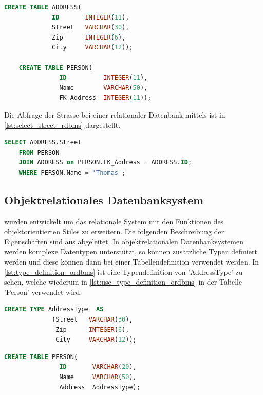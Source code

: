 \begin{lstlisting}[language=SQL, caption=Tabellendefinition in relationalem Datenbanksystem, label=lst:table_definition_rdbms]  
    CREATE TABLE ADDRESS(
             ID       INTEGER(11),
             Street   VARCHAR(30),
             Zip      INTEGER(6),
             City     VARCHAR(12));

    CREATE TABLE PERSON(
               ID          INTEGER(11),
               Name        VARCHAR(50),
               FK_Address  INTEGER(11));
\end{lstlisting}

Die Abfrage der Strasse bei einer relationaler Datenbank mittels  ist in \autoref{lst:select_street_rdbms} dargestellt.

\begin{lstlisting}[language=SQL, caption=Abfrage in relationalem Datenbanksystem, label=lst:select_street_rdbms]  
    SELECT ADDRESS.Street
    FROM PERSON 
    JOIN ADDRESS on PERSON.FK_Address = ADDRESS.ID;
    WHERE PERSON.Name = 'Thomas';
\end{lstlisting}

\subsection{Objektrelationales Datenbanksystem}\label{ordbms}
 wurden entwickelt um das relationale System mit den Funktionen des objektorientierten Stiles zu erweitern.
Die folgenden Beschreibung der Eigenschaften sind aus \cite{limited2010introduction} abgeleitet. In objektrelationalen Datenbanksystemen werden 
komplexe Datentypen unterstützt, so können zusätzliche Typen definiert werden und diese können dann bei einer Tabellendefinition verwendet werden.  
In \autoref{lst:type_definition_ordbms} ist eine Typendefinition von 'AddressType' zu sehen, welche wiederum in \autoref{lst:use_type_definition_ordbms} 
in der Tabelle 'Person' verwendet wird.

\begin{lstlisting}[language=SQL, caption=Typendefinition in objektrelationalem Datenbanksystem, label=lst:type_definition_ordbms]  
    CREATE TYPE AddressType  AS
             (Street   VARCHAR(30),
              Zip      INTEGER(6),
              City     VARCHAR(12));
\end{lstlisting}

\begin{lstlisting}[language=SQL, caption=Verwendung von Typendefinition in objektrelationalem Datenbanksystem, label=lst:use_type_definition_ordbms]  
    CREATE TABLE PERSON(
               ID       VARCHAR(20),
               Name     VARCHAR(50),
               Address  AddressType);
\end{lstlisting}


